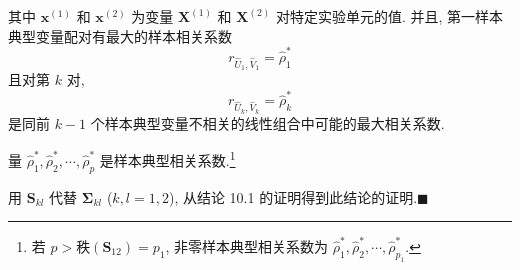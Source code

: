 
其中 $\mathbf{x}^{(1)}$ 和 $\mathbf{x}^{(2)}$ 为变量 $\mathbf{X}^{(1)}$ 和 $\mathbf{X}^{(2)}$ 对特定实验单元的值. 并且, 第一样本典型变量配对有最大的样本相关系数
\[
r_{\hat{U}_1,\hat{V}_1}=\hat{\rho}_1^*
\]
且对第 $k$ 对,
\[
r_{\hat{U}_k,\hat{V}_k}=\hat{\rho}_k^*
\]
是同前 $k-1$ 个样本典型变量不相关的线性组合中可能的最大相关系数.

量 $\hat{\rho}_1^*,\hat{\rho}_2^*,\cdots,\hat{\rho}_p^*$ 是样本典型相关系数.\footnote{{\footnotesize 若 $p>\text{秩}(\mathbf{S}_{12})=p_1$, 非零样本典型相关系数为 $\hat{\rho}_1^*,\hat{\rho}_2^*,\cdots,\hat{\rho}_{p_1}^*$.}

}

\noindent{}\quad 用 $\mathbf{S}_{kl}$ 代替 $\boldsymbol{\Sigma}_{kl}$ ($k,l=1,2$), 从结论 10.1 的证明得到此结论的证明.\hfill$\blacksquare$

